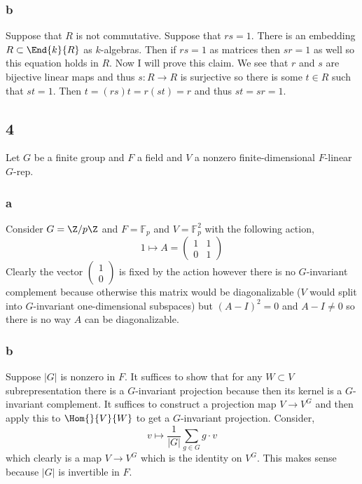 \documentclass[12pt]{article}
\renewcommand{\F}{\mathbb{F}}
\begin{document}
\subsubsection{b}

Suppose that $R$ is not commutative. Suppose that $rs = 1$. There is an embedding $R \subset \End{k}{R}$ as $k$-algebras. Then if $rs = 1$ as matrices then $sr = 1$ as well so this equation holds in $R$. Now I will prove this claim. We see that $r$ and $s$ are bijective linear maps and thus $s : R \to R$ is surjective so there is some $t \in R$ such that $st = 1$. Then $t = (rs)t = r(st) = r$ and thus $st = sr = 1$. 


\subsection{4}

Let $G$ be a finite group and $F$ a field and $V$ a nonzero finite-dimensional $F$-linear $G$-rep.

\subsubsection{a}

Consider $G = \Z / p \Z$ and $F = \F_p$ and $V = \F_p^2$ with the following action,
\[ 1 \mapsto A =
\begin{pmatrix}
1 & 1 
\\
0 & 1
\end{pmatrix} \]
Clearly the vector $\begin{pmatrix}
1
\\
0
\end{pmatrix}$ is fixed by the action however there is no $G$-invariant complement because otherwise this matrix would be diagonalizable ($V$ would split into $G$-invariant one-dimensional subspaces) but $(A - I)^2 = 0$ and $A - I \neq 0$ so there is no way $A$ can be diagonalizable.

\subsubsection{b}

Suppose $|G|$ is nonzero in $F$. It suffices to show that for any $W \subset V$ subrepresentation there is a $G$-invariant projection because then its kernel is a $G$-invariant complement. It suffices to construct a projection map $V \to V^G$ and then apply this to $\Hom{}{V}{W}$ to get a $G$-invariant projection. Consider,
\[ v \mapsto \frac{1}{|G|} \sum_{g \in G} g \cdot v \]
which clearly is a map $V \to V^G$ which is the identity on $V^G$. This makes sense because $|G|$ is invertible in $F$.
\end{document}
